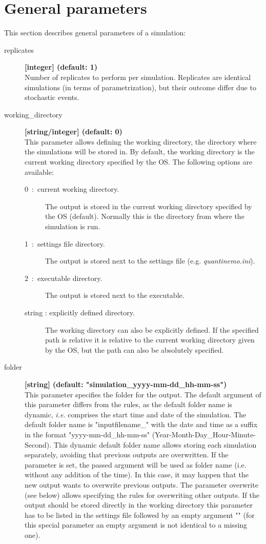 \documentclass[letterpaper,12pt,oneside]{book}
\begin{document}
\chapter{General parameters}\label{chap:GeneralParameters}
This section describes general parameters of a simulation: 
\begin{description}

 
\item[replicates]\textbf{[integer] (default: 1)}\\
Number of replicates to perform per simulation. Replicates are identical simulations (in terms of parametrization), but their outcome differ due to stochastic events. 

\item[working\_directory]\textbf{[string/integer] (default: 0)}\\
This parameter allows defining the working directory, the directory where the simulations will be stored in. By default, the working directory is the current working directory specified by the OS. The following options are available:
\begin{description}
\item[0~:~current working directory.] The output is stored in the current working directory specified by the OS (default). Normally this is the directory from where the simulation is run. 
\item[1~:~settings file directory.] The output is stored next to the settings file (e.g. \textit{quantinemo.ini}).
\item[2~:~executable directory.] The output is stored next to the executable.  
\item[string : explicitly defined directory.] The working directory can also be explicitly defined. If the specified path is relative it is relative to the current working directory given by the OS, but the path can also be absolutely specified.
\end{description}


\item[folder]\textbf{[string] (default: "simulation\_yyyy-mm-dd\_hh-mm-ss")}\\
This parameter specifies the folder for the output. The default argument of this parameter differs from the rules, as the default folder name is dynamic, \textit{i.e.} comprises the start time and date of the simulation. The default folder name is "inputfilename\_" with the date and time as a suffix in the format "yyyy-mm-dd\_hh-mm-ss" (Year-Month-Day\_Hour-Minute-Second). This dynamic default folder name allows storing each simulation separately, avoiding that previous outputs are overwritten. If the parameter is set, the passed argument will be used as folder name (i.e. without any addition of the time). In this case, it may happen that the new output wants to overwrite previous outputs. The parameter \textsf{overwrite} (see below) allows specifying the rules for overwriting other outputs. If the output should be stored directly in the working directory this parameter has to be listed in the settings file followed by an empty argument "" (for this special parameter an empty argument is not identical to a missing one).


\end{description}
\end{document}
